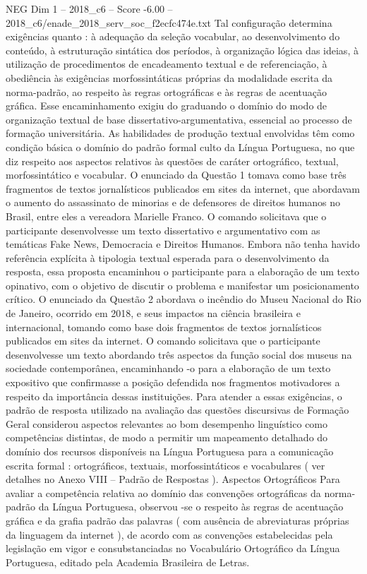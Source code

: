 \begin{textsample}{NEG Dim 1 – 2018\_c6 – Score -6.00 – 2018\_c6/enade\_2018\_serv\_soc\_f2ecfc474e.txt}
Tal configuração determina exigências quanto : à adequação da seleção vocabular, ao desenvolvimento do conteúdo, à estruturação sintática dos períodos, à organização lógica das ideias, à utilização de procedimentos de encadeamento textual e de referenciação, à obediência às exigências morfossintáticas próprias da modalidade escrita da norma-padrão, ao respeito às regras ortográficas e às regras de acentuação gráfica.
Esse encaminhamento exigiu do graduando o domínio do modo de organização textual de base dissertativo-argumentativa, essencial ao processo de formação universitária.
As habilidades de produção textual envolvidas têm como condição básica o domínio do padrão formal culto da Língua Portuguesa, no que diz respeito aos aspectos relativos às questões de caráter ortográfico, textual, morfossintático e vocabular.
O enunciado da Questão 1 tomava como base três fragmentos de textos jornalísticos publicados em sites da internet, que abordavam o aumento do assassinato de minorias e de defensores de direitos humanos no Brasil, entre eles a vereadora Marielle Franco.
O comando solicitava que o participante desenvolvesse um texto dissertativo e argumentativo com as temáticas Fake News, Democracia e Direitos Humanos.
Embora não tenha havido referência explícita à tipologia textual esperada para o desenvolvimento da resposta, essa proposta encaminhou o participante para a elaboração de um texto opinativo, com o objetivo de discutir o problema e manifestar um posicionamento crítico.
O enunciado da Questão 2 abordava o incêndio do Museu Nacional do Rio de Janeiro, ocorrido em 2018, e seus impactos na ciência brasileira e internacional, tomando como base dois fragmentos de textos jornalísticos publicados em sites da internet.
O comando solicitava que o participante desenvolvesse um texto abordando três aspectos da função social dos museus na sociedade contemporânea, encaminhando -o para a elaboração de um texto expositivo que confirmasse a posição defendida nos fragmentos motivadores a respeito da importância dessas instituições.
Para atender a essas exigências, o padrão de resposta utilizado na avaliação das questões discursivas de Formação Geral considerou aspectos relevantes ao bom desempenho linguístico como competências distintas, de modo a permitir um mapeamento detalhado do domínio dos recursos disponíveis na Língua Portuguesa para a comunicação escrita formal : ortográficos, textuais, morfossintáticos e vocabulares ( ver detalhes no Anexo VIII – Padrão de Respostas ).
Aspectos Ortográficos Para avaliar a competência relativa ao domínio das convenções ortográficas da norma-padrão da Língua Portuguesa, observou -se o respeito às regras de acentuação gráfica e da grafia padrão das palavras ( com ausência de abreviaturas próprias da linguagem da internet ), de acordo com as convenções estabelecidas pela legislação em vigor e consubstanciadas no Vocabulário Ortográfico da Língua Portuguesa, editado pela Academia Brasileira de Letras.

\end{textsample}
